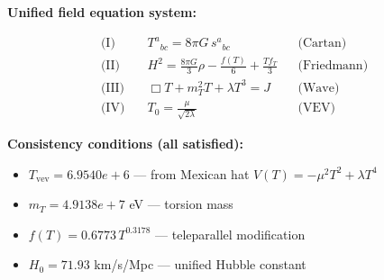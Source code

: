 
\textbf{Unified field equation system:}

\begin{align}
  \text{(I)} \quad & T^a{}_{bc} = 8\pi G \, s^a{}_{bc} && \text{(Cartan)} \\
  \text{(II)} \quad & H^2 = \frac{8\pi G}{3}\rho - \frac{f(T)}{6} + \frac{Tf_T}{3} && \text{(Friedmann)} \\
  \text{(III)} \quad & \Box T + m_T^2 T + \lambda T^3 = J && \text{(Wave)} \\
  \text{(IV)} \quad & T_0 = \frac{\mu}{\sqrt{2\lambda}} && \text{(VEV)}
\end{align}

\textbf{Consistency conditions (all satisfied):}
\begin{itemize}
  \item $T_{\text{vev}} = 6.9540e+6$ — from Mexican hat $V(T) = -\mu^2 T^2 + \lambda T^4$
  \item $m_T = 4.9138e+7$ eV — torsion mass
  \item $f(T) = 0.6773 \, T^{0.3178}$ — teleparallel modification
  \item $H_0 = 71.93$ km/s/Mpc — unified Hubble constant
\end{itemize}